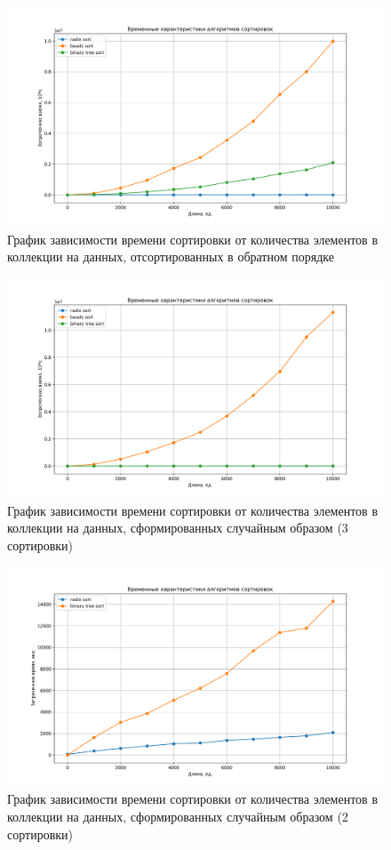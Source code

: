 \begin{figure}[h!]
\centering
\includegraphics[width=1\linewidth]{inc/img/sort_time_graph_1.png}
\caption{График зависимости времени сортировки от количества элементов в коллекции на данных, отсортированных в обратном порядке}
\label{gra:rsor}
\end{figure}

\begin{figure}[h!]
\centering
\includegraphics[width=1\linewidth]{inc/img/sort_time_graph_2.png}
\caption{График зависимости времени сортировки от количества элементов в коллекции на данных, сформированных случайным образом (3 сортировки)}
\label{gra:rand}
\end{figure}

\begin{figure}[h!]
	\centering
	\includegraphics[width=1\linewidth]{inc/img/sort_time_graph_3.png}
	\caption{График зависимости времени сортировки от количества элементов в коллекции на данных, сформированных случайным образом (2 сортировки)}
	\label{gra:rand_2}
\end{figure}


